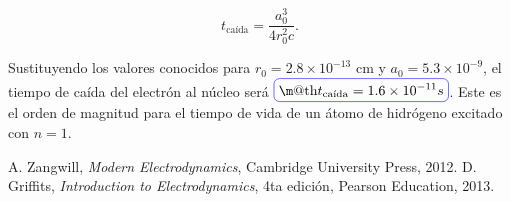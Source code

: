 \documentclass[a4paper,11pt]{article}
\makeatletter
\numberwithin{equation}{section}
\newcommand*{\boxcolor}{blue}
\renewcommand{\boxed}[1]{\textcolor{\boxcolor}{%
\tikz[baseline={([yshift=-1ex]current bounding box.center)}] \node [rectangle, minimum width=1ex,rounded corners,draw] {\normalcolor\m@th$\displaystyle#1$};}}
\makeatother
\begin{document}
\begin{equation}
 t_{\text{caída}} = \frac{a_0^3}{4r_0^2c}.
\end{equation}

Sustituyendo los valores conocidos para $r_0 = 2.8 \times 10^{-13}$ cm y 
$a_0 = 5.3 \times 10^{-9}$, el tiempo de caída del electrón al núcleo será 
$\boxed{t_{\text{caída}} = 1.6 \times 10^{-11} s}$. Este es el orden de magnitud para el tiempo de 
vida de un átomo de hidrógeno excitado con $n=1$.

\begin{thebibliography}{10}
 A. Zangwill, \emph{Modern Electrodynamics}, Cambridge University Press, 2012.
 D. Griffits, \emph{Introduction to Electrodynamics}, 4ta edición, Pearson Education, 
 2013.
\end{thebibliography}
\end{document}
